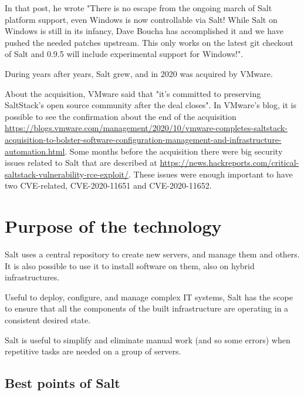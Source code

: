 \documentclass[12pt,a4paper,openright,twoside]{book}
\begin{document}
In that post, he wrote "There is no escape from the ongoing march of Salt platform support, even Windows is now controllable via Salt! While Salt on Windows is still in its infancy, Dave Boucha has accomplished it and we have pushed the needed patches upstream. This only works on the latest git checkout of Salt and 0.9.5 will include experimental support for Windows!"\cite{saltPost2}.

During years after years, Salt grew, and in 2020 was acquired by VMware.

About the acquisition, VMware said that "it's committed to preserving SaltStack's open source community after the deal closes"\cite{saltAcq}.
In VMware's blog, it is possible to see the confirmation about the end of the acquisition \url{https://blogs.vmware.com/management/2020/10/vmware-completes-saltstack-acquisition-to-bolster-software-configuration-management-and-infrastructure-automation.html}.
Some months before the acquisition there were big security issues related to Salt that are described at \url{https://news.hackreports.com/critical-saltstack-vulnerability-rce-exploit/}.
These issues were enough important to have two CVE-related, CVE-2020-11651 and CVE-2020-11652.

\section{Purpose of the technology}
Salt uses a central repository to create new servers, and manage them and others. It is also possible to use it to install software on them, also on hybrid infrastructures.


Useful to deploy, configure, and manage complex IT systems, Salt has the scope to ensure that all the components of the built infrastructure are operating in a consistent desired state.


Salt is useful to simplify and eliminate manual work (and so some errors) when repetitive tasks are needed on a group of servers.

\subsection{Best points of Salt}
\end{document}
